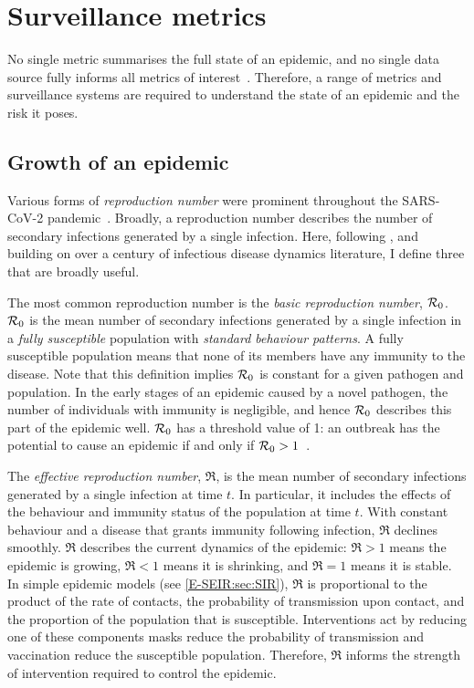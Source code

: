 \documentclass[thesis.tex]{subfiles}
\begin{document}
\section{Surveillance metrics} \label{intro:sec:metrics}

No single metric summarises the full state of an epidemic, and no single data source fully informs all metrics of interest~\autocite{royalSocietyRnumber,pellisEstimation,paragGrowthRates}.
Therefore, a range of metrics and surveillance systems are required to understand the state of an epidemic and the risk it poses.

\subsection{Growth of an epidemic}

Various forms of \emph{reproduction number} were prominent throughout the SARS-CoV-2 pandemic~\autocite{pellisEstimation}.
Broadly, a reproduction number describes the number of secondary infections generated by a single infection.
Here, following \textcite{pellisEstimation}, and building on over a century of infectious disease dynamics literature, I define three that are broadly useful.

The most common reproduction number is the \emph{basic reproduction number}, $\mathcal{R}_{0}$.
$\mathcal{R}_{0}$ is the mean number of secondary infections generated by a single infection in a \emph{fully susceptible} population with \emph{standard behaviour patterns}.
A fully susceptible population means that none of its members have any immunity to the disease.
Note that this definition implies $\mathcal{R}_{0}$ is constant for a given pathogen and population.
In the early stages of an epidemic caused by a novel pathogen, the number of individuals with immunity is negligible, and hence $\mathcal{R}_{0}$ describes this part of the epidemic well.
$\mathcal{R}_{0}$ has a threshold value of 1: an outbreak has the potential to cause an epidemic if and only if $\mathcal{R}_{0} > 1$~\autocite[76]{diekmannMathematical}.

The \emph{effective reproduction number}, $\Re$, is the mean number of secondary infections generated by a single infection at time $t$.
In particular, it includes the effects of the behaviour and immunity status of the population at time $t$.
With constant behaviour and a disease that grants immunity following infection, $\Re$ declines smoothly.
$\Re$ describes the current dynamics of the epidemic: $\Re > 1$ means the epidemic is growing, $\Re < 1$ means it is shrinking, and $\Re = 1$ means it is stable.
In simple epidemic models (see \cref{E-SEIR:sec:SIR}), $\Re$ is proportional to the product of the rate of contacts, the probability of transmission upon contact, and the proportion of the population that is susceptible.
Interventions act by reducing one of these components \eg masks reduce the probability of transmission and vaccination reduce the susceptible population.
Therefore, $\Re$ informs the strength of intervention required to control the epidemic.
\end{document}
